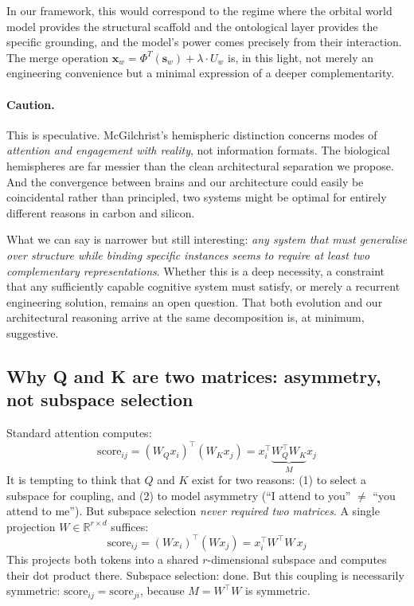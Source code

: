 \documentclass[11pt, a4paper]{article}
\newcommand{\x}{\mathbf{x}}
\newcommand{\s}{\mathbf{s}}
\newcommand{\R}{\mathbb{R}}
\theoremstyle{remark}
\begin{document}
In our framework, this would correspond to the regime where the orbital world model provides the structural scaffold and the ontological layer provides the specific grounding, and the model's power comes precisely from their interaction.
The merge operation $\x_w = \Phi^T(\s_w) + \lambda \cdot U_w$ is, in this light, not merely an engineering convenience but a minimal expression of a deeper complementarity.

\paragraph{Caution.}
This is speculative.
McGilchrist's hemispheric distinction concerns modes of \emph{attention and engagement with reality}, not information formats.
The biological hemispheres are far messier than the clean architectural separation we propose.
And the convergence between brains and our architecture could easily be coincidental rather than principled, two systems might be optimal for entirely different reasons in carbon and silicon.

What we can say is narrower but still interesting: \emph{any system that must generalise over structure while binding specific instances seems to require at least two complementary representations}.
Whether this is a deep necessity, a constraint that any sufficiently capable cognitive system must satisfy, or merely a recurrent engineering solution, remains an open question.
That both evolution and our architectural reasoning arrive at the same decomposition is, at minimum, suggestive.

\subsection*{Why Q and K are two matrices: asymmetry, not subspace selection}

Standard attention computes:
\[
\text{score}_{ij} = (W_Q x_i)^\top (W_K x_j) = x_i^\top \underbrace{W_Q^\top W_K}_{M} x_j
\]
It is tempting to think that $Q$ and $K$ exist for two reasons: (1) to select a subspace for coupling, and (2) to model asymmetry (``I attend to you'' $\neq$ ``you attend to me'').
But subspace selection \emph{never required two matrices}.
A single projection $W \in \R^{r \times d}$ suffices:
\[
\text{score}_{ij} = (Wx_i)^\top (Wx_j) = x_i^\top W^\top W \, x_j
\]
This projects both tokens into a shared $r$-dimensional subspace and computes their dot product there.
Subspace selection: done.
But this coupling is necessarily symmetric: $\text{score}_{ij} = \text{score}_{ji}$, because $M = W^\top W$ is symmetric.
\end{document}
